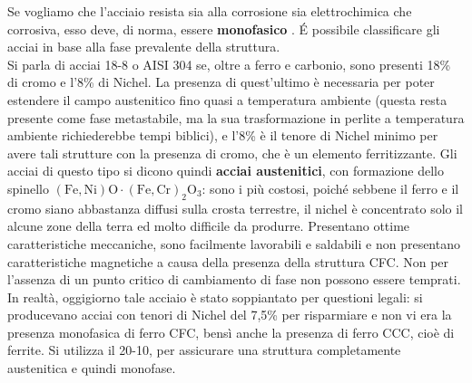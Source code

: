 Se vogliamo che l’acciaio resista sia alla corrosione sia elettrochimica che corrosiva, esso deve, di norma, essere \textbf{monofasico} . É possibile classificare gli acciai in base alla fase prevalente della struttura.\\
Si parla di acciai 18-8 o AISI 304 se, oltre a ferro e carbonio, sono presenti 18\%  di cromo e l’8\% di Nichel. La presenza di quest’ultimo è necessaria per poter estendere il campo austenitico fino quasi a temperatura ambiente (questa resta presente come fase metastabile, ma la sua trasformazione in perlite a temperatura ambiente richiederebbe tempi biblici), e l'8\% è il tenore di Nichel minimo per avere tali strutture con la presenza di cromo, che è un elemento ferritizzante. Gli acciai di questo tipo si dicono quindi \textbf{acciai austenitici}, con formazione dello spinello $\mathrm{(Fe,Ni)O\cdot(Fe,Cr)_2O_3}$: sono i più costosi, poiché sebbene il ferro e il cromo siano abbastanza diffusi sulla crosta terrestre, il nichel è concentrato solo il alcune zone della terra ed molto difficile da produrre. Presentano ottime caratteristiche meccaniche, sono facilmente lavorabili e saldabili e non presentano caratteristiche magnetiche a causa della presenza della struttura CFC. Non per l'assenza di un punto critico di cambiamento di fase non possono essere temprati.
In realtà, oggigiorno tale acciaio è stato soppiantato per questioni legali: si producevano acciai con tenori di Nichel del 7,5\% per risparmiare e non vi era la presenza monofasica di ferro CFC, bensì anche la presenza di ferro CCC, cioè di ferrite. Si utilizza il 20-10, per assicurare una struttura completamente austenitica e quindi monofase.

